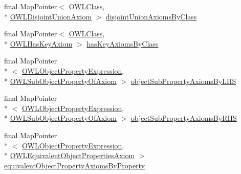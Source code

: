 \begin{DoxyCompactItemize}
\item 
final Map\-Pointer$<$ \hyperlink{interfaceorg_1_1semanticweb_1_1owlapi_1_1model_1_1_o_w_l_class}{O\-W\-L\-Class}, \\*
\hyperlink{interfaceorg_1_1semanticweb_1_1owlapi_1_1model_1_1_o_w_l_disjoint_union_axiom}{O\-W\-L\-Disjoint\-Union\-Axiom} $>$ \hyperlink{classuk_1_1ac_1_1manchester_1_1cs_1_1owl_1_1owlapi_1_1_abstract_internals_impl_a049f9d096742f72d1eb5f273f4ea3f47}{disjoint\-Union\-Axioms\-By\-Class}
\item 
final Map\-Pointer$<$ \hyperlink{interfaceorg_1_1semanticweb_1_1owlapi_1_1model_1_1_o_w_l_class}{O\-W\-L\-Class}, \\*
\hyperlink{interfaceorg_1_1semanticweb_1_1owlapi_1_1model_1_1_o_w_l_has_key_axiom}{O\-W\-L\-Has\-Key\-Axiom} $>$ \hyperlink{classuk_1_1ac_1_1manchester_1_1cs_1_1owl_1_1owlapi_1_1_abstract_internals_impl_a47b2fcc514b40007a4efa0e5658a640a}{has\-Key\-Axioms\-By\-Class}
\item 
final Map\-Pointer\\*
$<$ \hyperlink{interfaceorg_1_1semanticweb_1_1owlapi_1_1model_1_1_o_w_l_object_property_expression}{O\-W\-L\-Object\-Property\-Expression}, \\*
\hyperlink{interfaceorg_1_1semanticweb_1_1owlapi_1_1model_1_1_o_w_l_sub_object_property_of_axiom}{O\-W\-L\-Sub\-Object\-Property\-Of\-Axiom} $>$ \hyperlink{classuk_1_1ac_1_1manchester_1_1cs_1_1owl_1_1owlapi_1_1_abstract_internals_impl_af46944f936be56c97588c41d124ae3ed}{object\-Sub\-Property\-Axioms\-By\-L\-H\-S}
\item 
final Map\-Pointer\\*
$<$ \hyperlink{interfaceorg_1_1semanticweb_1_1owlapi_1_1model_1_1_o_w_l_object_property_expression}{O\-W\-L\-Object\-Property\-Expression}, \\*
\hyperlink{interfaceorg_1_1semanticweb_1_1owlapi_1_1model_1_1_o_w_l_sub_object_property_of_axiom}{O\-W\-L\-Sub\-Object\-Property\-Of\-Axiom} $>$ \hyperlink{classuk_1_1ac_1_1manchester_1_1cs_1_1owl_1_1owlapi_1_1_abstract_internals_impl_a43524453e39fff81b9497426c6bc268f}{object\-Sub\-Property\-Axioms\-By\-R\-H\-S}
\item 
final Map\-Pointer\\*
$<$ \hyperlink{interfaceorg_1_1semanticweb_1_1owlapi_1_1model_1_1_o_w_l_object_property_expression}{O\-W\-L\-Object\-Property\-Expression}, \\*
\hyperlink{interfaceorg_1_1semanticweb_1_1owlapi_1_1model_1_1_o_w_l_equivalent_object_properties_axiom}{O\-W\-L\-Equivalent\-Object\-Properties\-Axiom} $>$ \hyperlink{classuk_1_1ac_1_1manchester_1_1cs_1_1owl_1_1owlapi_1_1_abstract_internals_impl_a1e27d391cbe6dc5af1ab1e3ab88f4e8d}{equivalent\-Object\-Property\-Axioms\-By\-Property}

\end{DoxyCompactItemize}
